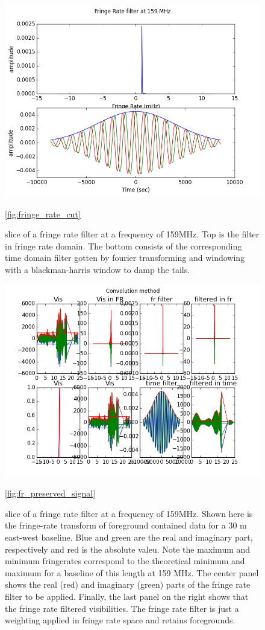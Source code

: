 \documentclass[twocolumn,numberedappendix]{emulateapj}
\begin{document}
\begin{figure}
\centering
\includegraphics[width=\columnwidth]{plots/fr_filter_slice.png}
\caption{slice of a fringe rate filter at a frequency of 159MHz. Top is the
filter in fringe rate domain. The bottom consists of the corresponding time
domain filter gotten by fourier transforming and windowing with a
blackman-harris window to damp the tails.}
\ref{fig:fringe_rate_cut}
\end{figure}

\begin{figure}[t!]\centering
\includegraphics[width=2\columnwidth]{plots/fr_preserved_signal.png}
\caption{slice of a fringe rate filter at a frequency of 159MHz. Shown here is
the fringe-rate transform of foreground contained data for a 30 m east-west
baseline. Blue and green are the real and imaginary part, respectively and red
is the absolute valeu. Note the maximum and minimum fringerates correspond to
the theoretical minimum and maximum for a baseline of this length at 159 MHz.
The center panel shows the real (red)  and imaginary (green) parts of the fringe
rate filter to be applied. Finally, the last panel on the right shows that the
fringe rate filtered visibilities. The fringe rate filter is just a weighting
applied in fringe rate space and retains foregrounds.}
\ref{fig:fr_preserved_signal}
\end{figure}
\end{document}
